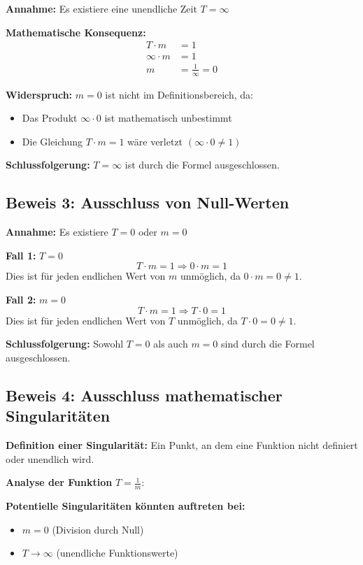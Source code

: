 \documentclass[12pt,a4paper]{article}
\theoremstyle{definition}
\theoremstyle{remark}
\begin{document}
\textbf{Annahme:} Es existiere eine unendliche Zeit $T = \infty$

\textbf{Mathematische Konsequenz:}
\begin{align}
	T \cdot m &= 1\\
	\infty \cdot m &= 1\\
	m &= \frac{1}{\infty} = 0
\end{align}

\textbf{Widerspruch:} $m = 0$ ist nicht im Definitionsbereich, da:
\begin{itemize}
	\item Das Produkt $\infty \cdot 0$ ist mathematisch unbestimmt
	\item Die Gleichung $T \cdot m = 1$ wäre verletzt $(\infty \cdot 0 \neq 1)$
\end{itemize}

\textbf{Schlussfolgerung:} $T = \infty$ ist durch die Formel ausgeschlossen.

\subsection{Beweis 3: Ausschluss von Null-Werten}

\textbf{Annahme:} Es existiere $T = 0$ oder $m = 0$

\textbf{Fall 1:} $T = 0$
\begin{equation}
	T \cdot m = 1 \Rightarrow 0 \cdot m = 1
\end{equation}
Dies ist für jeden endlichen Wert von $m$ unmöglich, da $0 \cdot m = 0 \neq 1$.

\textbf{Fall 2:} $m = 0$
\begin{equation}
	T \cdot m = 1 \Rightarrow T \cdot 0 = 1
\end{equation}
Dies ist für jeden endlichen Wert von $T$ unmöglich, da $T \cdot 0 = 0 \neq 1$.

\textbf{Schlussfolgerung:} Sowohl $T = 0$ als auch $m = 0$ sind durch die Formel ausgeschlossen.

\subsection{Beweis 4: Ausschluss mathematischer Singularitäten}

\textbf{Definition einer Singularität:} Ein Punkt, an dem eine Funktion nicht definiert oder unendlich wird.

\textbf{Analyse der Funktion} $T = \frac{1}{m}$:

\textbf{Potentielle Singularitäten könnten auftreten bei:}
\begin{itemize}
	\item $m = 0$ (Division durch Null)
	\item $T \to \infty$ (unendliche Funktionswerte)
\end{itemize}
\end{document}
